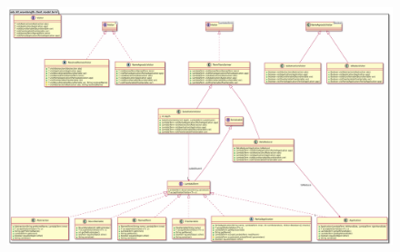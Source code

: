 \begin{figure}[H]
	\centering
	\includegraphics[width=\textwidth]{packageDiagrams/termPackage}
\end{figure}